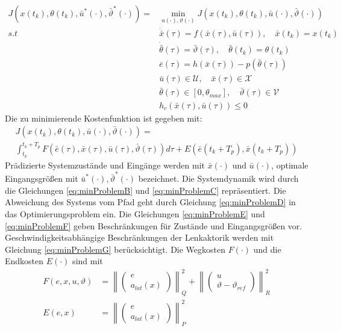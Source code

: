 \begin{subequations}
\begin{align}
    J(x(t_k),\theta(t_k),\bar{u}^{*}(\cdot),\bar{\vartheta}^{*}(\cdot)) = &\underset{u(\cdot), \vartheta(\cdot)}{\min} J(x(t_k), \theta(t_k), \bar{u}(\cdot), \bar{\vartheta}(\cdot)) \label{eq:minProblemA}\\
    s.t \hspace{30pt} &\dot{\bar{x}}(\tau) = f(\bar{x}(\tau), \bar{u}(\tau)), \quad \bar{x}(t_k) = x(t_k) \label{eq:minProblemB}\\
    &\dot{\bar{\theta}}(\tau) = \bar{\vartheta}(\tau), \quad \bar{\theta}(t_k) = \theta(t_k) \label{eq:minProblemC}\\
    &\bar{e}(\tau) = h(\bar{x}(\tau)) - p(\bar{\theta}(\tau)) \label{eq:minProblemD}\\
    &\bar{u}(\tau) \in \mathcal{U}, \quad \bar{x}(\tau) \in \mathcal{X} \label{eq:minProblemE}\\
    &\bar{\theta}(\tau) \in [0, \theta_{max}], \quad \bar{\vartheta}(\tau) \in \mathcal{V} \label{eq:minProblemF}\\
    &h_c(\bar{x}(\tau), \bar{u}(\tau)) \leq 0 \label{eq:minProblemG}
\end{align}
\end{subequations}
\noindent Die zu minimierende Kostenfunktion ist gegeben mit:
\begin{multline}
    J(x(t_k),\theta(t_k),\bar{u}(\cdot),\bar{\vartheta}(\cdot)) = \\ \int_{t_k}^{t_k + T_p} F(\bar{e}(\tau),\bar{x}(\tau),\bar{u}(\tau),\bar{\vartheta}(\tau))d\tau + E(\bar{e}(t_k+T_p),\bar{x}(t_k+T_p))
    \label{eq:cost_function_mpfc}
\end{multline}
\noindent Prädizierte Systemzustände und Eingänge werden mit $\bar{x}(\cdot)$ und $\bar{u}(\cdot)$, optimale Eingangsgrößen mit $\bar{u}^{*}(\cdot),\bar{\vartheta}^{*}(\cdot)$ bezeichnet. Die Systemdynamik wird durch die Gleichungen \ref{eq:minProblemB} und \ref{eq:minProblemC} repräsentiert. Die Abweichung des Systems vom Pfad geht durch Gleichung \ref{eq:minProblemD} in das Optimierungsproblem ein. Die Gleichungen \ref{eq:minProblemE} und \ref{eq:minProblemF} geben Beschränkungen für Zustände und Eingangsgrößen vor. Geschwindigkeitsabhängige Beschränkungen der Lenkaktorik werden mit Gleichung \ref{eq:minProblemG} berücksichtigt. 
\noindent Die Wegkosten $F(\cdot)$ und die Endkosten $E(\cdot)$ sind mit
\begin{align}
    F(e, x, u, \vartheta) &= \left\|\left( \begin{matrix} e \\a_{lat}(x) \end{matrix} \right)\right\|_Q^2 + \left\|\left( \begin{matrix} u \\ \vartheta - \vartheta_{ref} \end{matrix} \right)\right\|_R^2 \\
    E(e, x) &= \left\|\left( \begin{matrix} e \\ a_{lat}(x) \end{matrix} \right)\right\|_P^2
\end{align}
